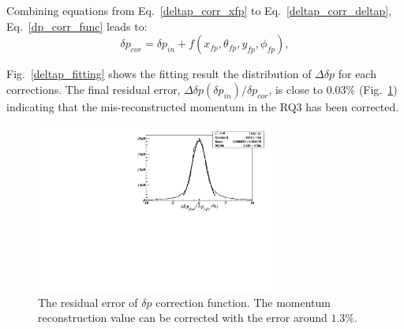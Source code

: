  Combining equations from Eq.~\eqref{deltap_corr_xfp} to Eq.~\eqref{deltap_corr_deltap}, Eq.~\eqref{dp_corr_func} leads to:
\begin{equation}
  \delta p_{cor}= \delta p_{in}+ f(x_{fp}, \theta_{fp}, y_{fp}, \phi_{fp}),
   \label{deltap_corr_all}
\end{equation}

 Fig.~\ref{deltap_fitting} shows the fitting result the distribution of $\Delta\delta p$ for each corrections. The final residual error, $\Delta\delta p(\delta p_{in})/\delta p_{cor}$, is close to $ 0.03\%$ (Fig.~\ref{deltap_final}) indicating that the mis-reconstructed momentum in the RQ3 has been corrected.
\begin{figure}[!ht]
 \begin{center}
  \includegraphics[type=pdf, ext=.pdf,read=.pdf,width=0.7\textwidth]{./figures/apend/DeltaCorr4_Kin31}
  \caption[The residual error of $\delta p$ correction function]{The residual error of $\delta p$ correction function. The momentum reconstruction value can be corrected with the error around $1.3\%$.}
  \label{deltap_final}
 \end{center}
\end{figure}
